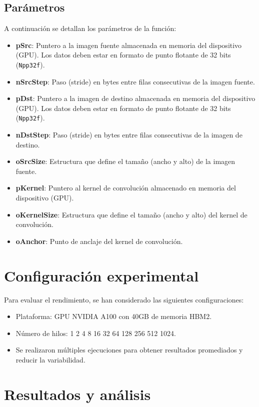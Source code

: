 \subsection{Parámetros}
A continuación se detallan los parámetros de la función:
\begin{itemize}
    \item \textbf{pSrc}: Puntero a la imagen fuente almacenada en memoria del dispositivo (GPU). Los datos deben estar en formato de punto flotante de 32 bits (\texttt{Npp32f}).
    \item \textbf{nSrcStep}: Paso (stride) en bytes entre filas consecutivas de la imagen fuente.
    \item \textbf{pDst}: Puntero a la imagen de destino almacenada en memoria del dispositivo (GPU). Los datos deben estar en formato de punto flotante de 32 bits (\texttt{Npp32f}).
    \item \textbf{nDstStep}: Paso (stride) en bytes entre filas consecutivas de la imagen de destino.
    \item \textbf{oSrcSize}: Estructura que define el tamaño (ancho y alto) de la imagen fuente.
    \item \textbf{pKernel}: Puntero al kernel de convolución almacenado en memoria del dispositivo (GPU).
    \item \textbf{oKernelSize}: Estructura que define el tamaño (ancho y alto) del kernel de convolución.
    \item \textbf{oAnchor}: Punto de anclaje del kernel de convolución.
\end{itemize}


\section{Configuración experimental}

Para evaluar el rendimiento, se han considerado las siguientes configuraciones:
\begin{itemize}
\item Plataforma: GPU NVIDIA A100 con 40GB de memoria HBM2.
\item Número de hilos: 1 2 4 8 16 32 64 128 256 512 1024.
\item Se realizaron múltiples ejecuciones para obtener resultados promediados y reducir la variabilidad.
\end{itemize}


\newpage

\section{Resultados y análisis}
    
